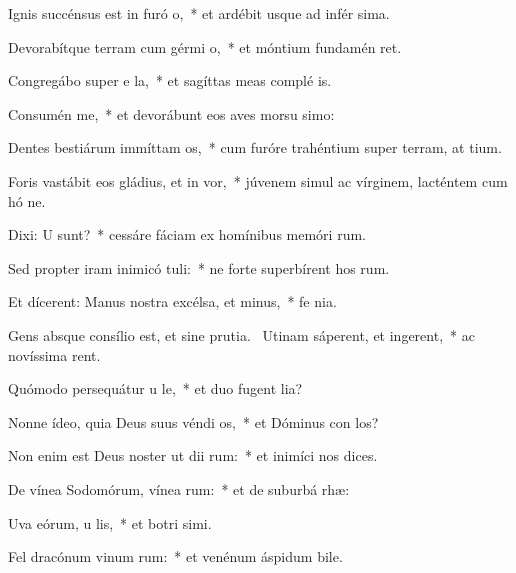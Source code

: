 \item Ignis succénsus est in furó o,~* et ardébit usque ad infér sima.
\item Devorabítque terram cum gérmi o,~* et móntium fundamén ret.
\item Congregábo super e la,~* et sagíttas meas complé  is.
\item Consumén me,~* et devorábunt eos aves morsu simo:
\item Dentes bestiárum immíttam  os,~* cum furóre trahéntium super terram, at tium.
\item Foris vastábit eos gládius, et in vor,~* júvenem simul ac vírginem, lacténtem cum hó ne.
\item Dixi: U sunt?~* cessáre fáciam ex homínibus memóri rum.
\item Sed propter iram inimicó tuli:~* ne forte superbírent hos rum.
\item Et dícerent: Manus nostra excélsa, et  minus,~* fe  nia.
\item Gens absque consílio est, et sine prutia.~\pscross{} Utinam sáperent, et ingerent,~* ac novíssima rent.
\item Quómodo persequátur u le,~* et duo fugent  lia?
\item Nonne ídeo, quia Deus suus véndi os,~* et Dóminus con los?
\item Non enim est Deus noster ut dii rum:~* et inimíci nos  dices.
\item De vínea Sodomórum, vínea rum:~* et de suburbá rhæ:
\item Uva eórum, u lis,~* et botri simi.
\item Fel dracónum vinum rum:~* et venénum áspidum bile.
